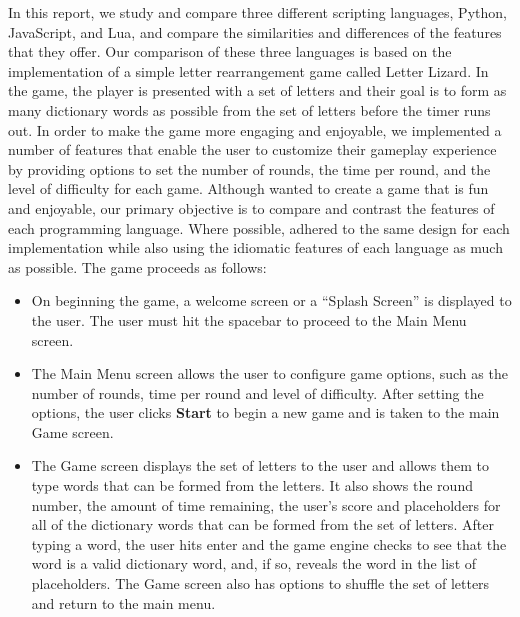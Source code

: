 In this report, we study and compare three different scripting languages, Python,
JavaScript, and Lua, and compare the similarities and differences of the features that
they offer. Our comparison of these three languages
is based on the implementation of a simple letter rearrangement game
called Letter Lizard. In the game, the player is presented with a set of letters and 
their goal is to form as many dictionary words as possible from the set of letters
before the timer runs out. In order to make the game
more engaging and enjoyable, we implemented a number of features that enable the user to customize
their gameplay experience by providing options to set the number of rounds, the time per round, 
and the level of difficulty for each
game. Although wanted to create a game that is fun and enjoyable, our primary objective is to
compare and contrast the features of each programming language. Where possible, adhered to the same
design for each implementation while also using the idiomatic features of each language as much as 
possible. The game proceeds as follows:

\begin{itemize}
    \item On beginning the game, a welcome screen or a ``Splash Screen'' is displayed
    to the user. The user must hit the spacebar to proceed to the Main Menu screen.
    \item The Main Menu screen allows the user to configure game options, such as the
    number of rounds, time per round and level of difficulty. After setting the options, the
    user clicks \textbf{Start} to begin a new game and is taken to the main Game screen.
    \item The Game screen displays the set of letters to the user and allows them to type
    words that can be formed from the letters. It also shows the round number, the amount of
    time remaining, the user's score and placeholders for all of the dictionary words that
    can be formed from the set of letters. After typing a word, the user hits
    enter and the game engine checks to see that the word is a valid dictionary word, and, if so,
    reveals the word in the list of placeholders. The Game screen also has options to shuffle
    the set of letters and return to the main menu.
\end{itemize}


